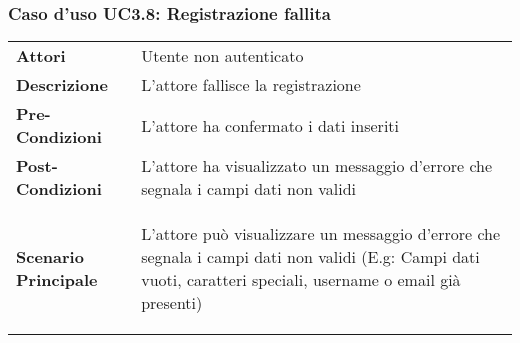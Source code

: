 \subsubsection{Caso d'uso UC3.8: Registrazione fallita}
\label{UC3_8}

\begin{minipage}{\linewidth}
\begin{longtable}{ l | p{11cm}}
	\hline
	\rowcolor{Gray}
	 \multicolumn{2}{c}{UC3.8 - Registrazione fallita} \\
	 \hline
	\textbf{Attori} & Utente non autenticato \\
	\textbf{Descrizione} & L'attore fallisce la registrazione  \\
	\textbf{Pre-Condizioni} & L'attore ha confermato i dati inseriti \\
	\textbf{Post-Condizioni} & L'attore ha visualizzato un messaggio d'errore che segnala i campi dati non validi \\
	\textbf{Scenario Principale} & 
	\begin{enumerate*}[label=(\arabic*.),itemjoin={\newline}]
		\item L'attore può visualizzare un messaggio d'errore che segnala i campi dati non validi (E.g: Campi dati vuoti, caratteri speciali, username o email già presenti) 
	\end{enumerate*}\\
\end{longtable}
\end{minipage}